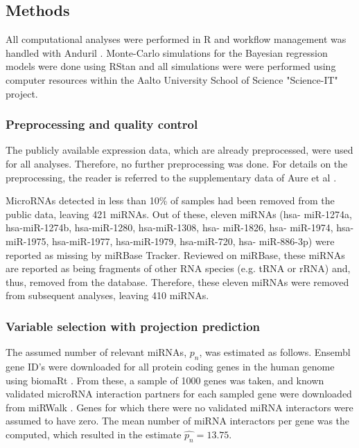 


\subsection{Methods}


All computational analyses were performed in R \citep{R} and workflow
management was handled with Anduril \citep{OvaskaXXXX}. Monte-Carlo
simulations for the Bayesian regression models were done using RStan
\citep{stan} and all simulations were were performed using computer
resources within the Aalto University School of Science "Science-IT"
project.




\subsubsection{Preprocessing and quality control}

The publicly available expression data, which are already preprocessed, were
used for all analyses. Therefore, no further preprocessing was done. For
details on the preprocessing, the reader is referred to the supplementary data
of Aure et al \citep{Aure2015}.

MicroRNAs detected in less than 10\% of samples had been removed from the
public data, leaving 421 miRNAs. Out of these, eleven miRNAs (hsa-
miR-1274a, hsa-miR-1274b, hsa-miR-1280, hsa-miR-1308, hsa- miR-1826, hsa-
miR-1974, hsa-miR-1975, hsa-miR-1977, hsa-miR-1979, hsa-miR-720, hsa-
miR-886-3p) were reported as missing by miRBase Tracker. Reviewed on miRBase,
these miRNAs are reported as being fragments of other RNA species (e.g. tRNA
or rRNA) and, thus, removed from the database. Therefore, these eleven miRNAs
were removed from subsequent analyses, leaving 410 miRNAs.



\subsubsection{Variable selection with projection prediction}

The assumed number of relevant miRNAs, $p_n$, was estimated as follows.
Ensembl gene ID's were downloaded for all protein coding genes in the human
genome using biomaRt \citep{biomaRt}. From these, a sample of 1000 genes was
taken, and known validated microRNA interaction partners for each sampled gene
were downloaded from miRWalk \citep{miRWalk}. Genes for which there were no
validated miRNA interactors were assumed to have zero. The mean number of
miRNA interactors per gene was the computed, which resulted in the estimate
$\hat{p_n} = 13.75$.

